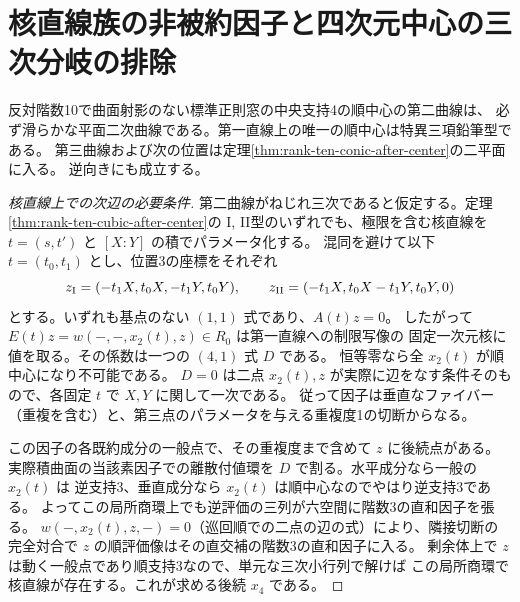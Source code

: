 \section{核直線族の非被約因子と四次元中心の三次分岐の排除}
\label{sec:rank-ten-cubic-kernel-divisor}
\begin{theorem}\label{thm:rank-ten-cubic-kernel-divisor}
反対階数10で曲面射影のない標準正則窓の中央支持4の順中心の第二曲線は、
必ず滑らかな平面二次曲線である。第一直線上の唯一の順中心は特異三項鉛筆型である。
第三曲線および次の位置は定理\ref{thm:rank-ten-conic-after-center}の二平面に入る。
逆向きにも成立する。
\end{theorem}
\begin{proof}[核直線上での次辺の必要条件]
第二曲線がねじれ三次であると仮定する。定理\ref{thm:rank-ten-cubic-after-center}の
I, II型のいずれでも、極限を含む核直線を $t=(s,t')$ と $[X:Y]$ の積でパラメータ化する。
混同を避けて以下 $t=(t_0,t_1)$ とし、位置3の座標をそれぞれ
\[
 z_{\rm I}=(-t_1X,t_0X,-t_1Y,t_0Y),\qquad
 z_{\rm II}=(-t_1X,t_0X-t_1Y,t_0Y,0)
\]
とする。いずれも基点のない $(1,1)$ 式であり、$A(t)z=0$。
したがって $E(t)z=w(-,-,x_2(t),z)\in R_0$ は第一直線への制限写像の
固定一次元核に値を取る。その係数は一つの $(4,1)$ 式 $D$ である。
恒等零なら全 $x_2(t)$ が順中心になり不可能である。
$D=0$ は二点 $x_2(t),z$ が実際に辺をなす条件そのもので、各固定 $t$ で $X,Y$ に関して一次である。
従って因子は垂直なファイバー（重複を含む）と、第三点のパラメータを与える重複度1の切断からなる。

この因子の各既約成分の一般点で、その重複度まで含めて $z$ に後続点がある。
実際積曲面の当該素因子での離散付値環を $D$ で割る。水平成分なら一般の $x_2(t)$ は
逆支持3、垂直成分なら $x_2(t)$ は順中心なのでやはり逆支持3である。
よってこの局所商環上でも逆評価の三列が六空間に階数3の直和因子を張る。
$w(-,x_2(t),z,-)=0$（巡回順での二点の辺の式）により、隣接切断の完全対合で
$z$ の順評価像はその直交補の階数3の直和因子に入る。
剰余体上で $z$ は動く一般点であり順支持3なので、単元な三次小行列で解けば
この局所商環で核直線が存在する。これが求める後続 $x_4$ である。
\end{proof}
